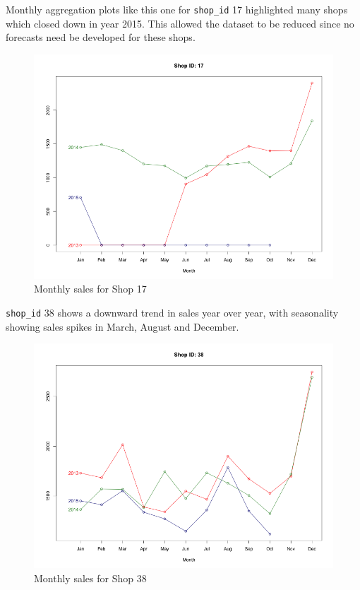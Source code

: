 \documentclass[floatsintext,man]{apa6}
\theoremstyle{definition}
\theoremstyle{definition}
\theoremstyle{definition}
\theoremstyle{remark}
\begin{document}
Monthly aggregation plots like this one for \texttt{shop\_id} 17
highlighted many shops which closed down in year 2015. This allowed the
dataset to be reduced since no forecasts need be developed for these
shops.

\begin{figure}
\centering
\includegraphics{../graphs/monthlyaverages_shop_id_17.png}
\caption{Monthly sales for Shop 17}
\end{figure}

\texttt{shop\_id} 38 shows a downward trend in sales year over year,
with seasonality showing sales spikes in March, August and December.

\begin{figure}
\centering
\includegraphics{../graphs/monthlyaverages_shop_id_38.png}
\caption{Monthly sales for Shop 38}
\end{figure}
\end{document}

